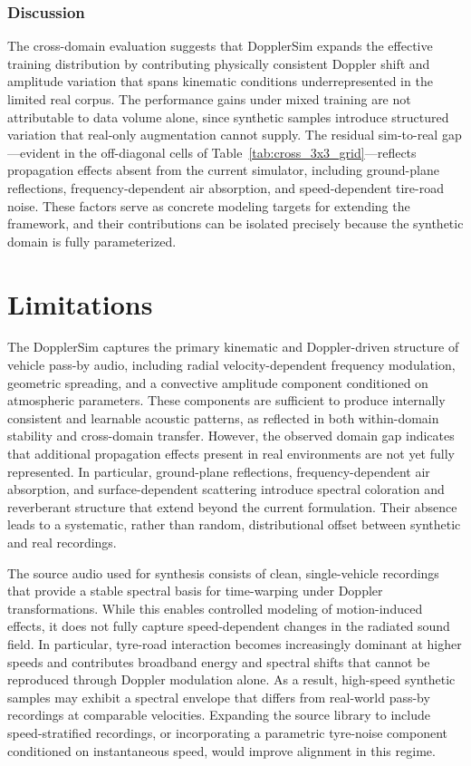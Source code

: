 \documentclass{article}
\begin{document}
\subsubsection{Discussion}
\label{sec:comparative}

The cross-domain evaluation suggests that DopplerSim expands the effective training distribution by contributing physically consistent Doppler shift and amplitude variation that spans kinematic conditions underrepresented in the limited real corpus. The performance gains under mixed training are not attributable to data volume alone, since synthetic samples introduce structured variation that real-only augmentation cannot supply. The residual sim-to-real gap---evident in the off-diagonal cells of Table~\ref{tab:cross_3x3_grid}---reflects propagation effects absent from the current simulator, including ground-plane reflections, frequency-dependent air absorption, and speed-dependent tire-road noise. These factors serve as concrete modeling targets for extending the framework, and their contributions can be isolated precisely because the synthetic domain is fully parameterized.
\section{Limitations}

The DopplerSim captures the primary kinematic and Doppler-driven structure of vehicle pass-by audio, including radial velocity-dependent frequency modulation, geometric spreading, and a convective amplitude component conditioned on atmospheric parameters. These components are sufficient to produce internally consistent and learnable acoustic patterns, as reflected in both within-domain stability and cross-domain transfer. However, the observed domain gap indicates that additional propagation effects present in real environments are not yet fully represented. In particular, ground-plane reflections, frequency-dependent air absorption, and surface-dependent scattering introduce spectral coloration and reverberant structure that extend beyond the current formulation. Their absence leads to a systematic, rather than random, distributional offset between synthetic and real recordings.

The source audio used for synthesis consists of clean, single-vehicle recordings that provide a stable spectral basis for time-warping under Doppler transformations. While this enables controlled modeling of motion-induced effects, it does not fully capture speed-dependent changes in the radiated sound field. In particular, tyre-road interaction becomes increasingly dominant at higher speeds and contributes broadband energy and spectral shifts that cannot be reproduced through Doppler modulation alone. As a result, high-speed synthetic samples may exhibit a spectral envelope that differs from real-world pass-by recordings at comparable velocities. Expanding the source library to include speed-stratified recordings, or incorporating a parametric tyre-noise component conditioned on instantaneous speed, would improve alignment in this regime.
\end{document}
